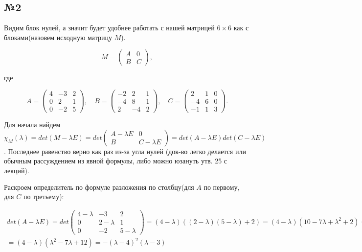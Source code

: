 \documentclass[11pt]{article}
\begin{document}
\subsection*{№2}
Видим блок нулей, а значит будет удобнее работать с нашей матрицей $6 \times 6$ как с блоками(назовем исходную матрицу $M$).

$$
M=\begin{pmatrix}
A & 0\\
B & C
\end{pmatrix},
$$

где

$$
A =
\begin{pmatrix}
4 & -3 & 2 \\
0 & 2 & 1 \\
0 & -2 & 5
\end{pmatrix}, \quad
B =
\begin{pmatrix}
-2 & 2 & 1 \\
-4 & 8 & 1 \\
2 & -4 & 2
\end{pmatrix}, \quad
C =
\begin{pmatrix}
2 & 1 & 0 \\
-4 & 6 & 0 \\
-1 & 1 & 3
\end{pmatrix}.
$$

Для начала найдем $\chi_M(\lambda) = det(M - \lambda E) = det \begin{pmatrix}A - \lambda E & 0 \\ B & C - \lambda E \end{pmatrix} = det(A - \lambda E) det(C - \lambda E)$. Последнее равенство верно как раз из-за угла нулей (док-во легко делается или обычным рассуждением из явной формулы, либо можно юзануть утв. 25 с лекций).

Раскроем определитель по формуле разложения по столбцу(для $A$ по первому, для $C$ по третьему):

$$
\begin{gathered}
det(A - \lambda E) = det
\begin{pmatrix}
4 - \lambda & -3 & 2 \\
0 & 2 - \lambda & 1 \\
0 & -2 & 5 - \lambda
\end{pmatrix} = (4 - \lambda)((2 - \lambda)(5 - \lambda) + 2) = (4 - \lambda)(10 - 7 \lambda + \lambda^2 + 2) = \\[6pt] = (4 - \lambda)(\lambda^2 - 7 \lambda + 12) = -(\lambda - 4)^2(\lambda - 3)
\end{gathered}
$$
\end{document}
